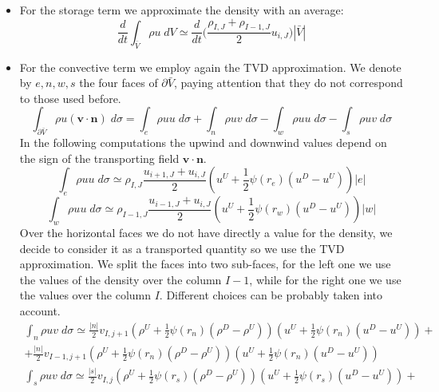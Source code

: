 \documentclass[12pt, a4paper]{article}
\begin{document}
\begin{itemize}
	\item For the storage term we approximate the density with an average:
	\begin{equation*}
\frac{d}{dt} \int_{\bar{V}} \rho u\; dV \simeq \frac{d}{dt} \bigg( 
\frac{\rho_{I,J}+\rho_{I-1,J}}{2} u_{i,J} \bigg)|\bar{V}|
	\end{equation*}
	\item For the convective term we employ again the TVD approximation. We 
	denote by $e,n,w,s$ the four faces of $\partial \bar{V}$, paying attention 
	that they do not correspond to those used before.
	\begin{equation*}
	\int_{\partial \bar{V}} \rho u 
	(\mathbf{v} \cdot 
	\mathbf{n}) \; d\sigma = \int_e \rho u u \; d\sigma + \int_n \rho u v \; 
	d\sigma - \int_w \rho u u \; d\sigma -\int_s \rho u v \; d\sigma
	\end{equation*}
	In the following computations the upwind and downwind values depend on the 
	sign of the transporting field 
	$\mathbf{v}\cdot\mathbf{n}$. 
	\begin{equation*}
	\int_e \rho u u \; d\sigma \simeq 
	\rho_{I,J}\frac{u_{i+1,J}+u_{i,J}}{2}(u^U+\frac{1}{2}\psi(r_e)(u^D-u^U))|e|
	\end{equation*}
	\begin{equation*}
		\int_w \rho u u \; d\sigma \simeq 
		\rho_{I-1,J}\frac{u_{i-1,J}+u_{i,J}}{2}(u^U+\frac{1}{2}\psi(r_w)(u^D-u^U))|w|
	\end{equation*}
	Over the horizontal faces we do not have directly a value for the density, 
	we decide to consider it as a transported quantity so we use the TVD 
	approximation. We split the faces into two sub-faces, for the left one we 
	use the values of the density over the column $I-1$, while for the right 
	one we use the values over the column $I$. Different choices can be 
	probably taken into account. 
	\begin{multline*}
	\int_n \rho u v \; d\sigma \simeq
	\frac{|n|}{2}v_{I,j+1}(\rho^U+\frac{1}{2}\psi(r_n)(\rho^D-\rho^U))
	(u^U+\frac{1}{2}\psi(r_n)(u^D-u^U)) +\\
	+\frac{|n|}{2}v_{I-1,j+1}(\rho^U+\frac{1}{2}\psi(r_n)(\rho^D-\rho^U))
	(u^U+\frac{1}{2}\psi(r_n)(u^D-u^U))
	\end{multline*}
	\begin{multline*}
	\int_s \rho u v \; d\sigma \simeq
	\frac{|s|}{2}v_{I,j}(\rho^U+\frac{1}{2}\psi(r_s)(\rho^D-\rho^U))
	(u^U+\frac{1}{2}\psi(r_s)(u^D-u^U)) +\\

\end{multline*}
\end{itemize}
\end{document}
